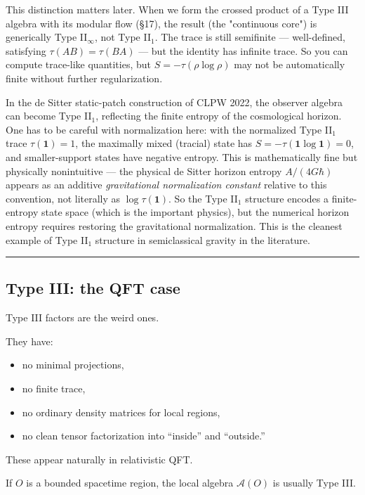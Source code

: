 \documentclass[11pt,a4paper]{article}
\begin{document}
This distinction matters later. When we form the crossed product of a Type III algebra with its modular flow (§17), the result (the "continuous core") is generically Type II$_\infty$, not Type II$_1$. The trace is still semifinite — well-defined, satisfying $\tau(AB) = \tau(BA)$ — but the identity has infinite trace. So you can compute trace-like quantities, but $S = -\tau(\rho \log \rho)$ may not be automatically finite without further regularization.

In the de Sitter static-patch construction of CLPW 2022, the observer algebra can become Type II$_1$, reflecting the finite entropy of the cosmological horizon. One has to be careful with normalization here: with the normalized Type II$_1$ trace $\tau(\mathbf{1}) = 1$, the maximally mixed (tracial) state has $S = -\tau(\mathbf{1} \log \mathbf{1}) = 0$, and smaller-support states have negative entropy. This is mathematically fine but physically nonintuitive — the physical de Sitter horizon entropy $A/(4G\hbar)$ appears as an additive \emph{gravitational normalization constant} relative to this convention, not literally as $\log \tau(\mathbf{1})$. So the Type II$_1$ structure encodes a finite-entropy state space (which is the important physics), but the numerical horizon entropy requires restoring the gravitational normalization. This is the cleanest example of Type II$_1$ structure in semiclassical gravity in the literature.

\medskip\hrule\medskip

\subsection{Type III: the QFT case}

Type III factors are the weird ones.

They have:

\begin{itemize}
  \item no minimal projections,
  \item no finite trace,
  \item no ordinary density matrices for local regions,
  \item no clean tensor factorization into “inside” and “outside.”
\end{itemize}

These appear naturally in relativistic QFT.

If $O$ is a bounded spacetime region, the local algebra $\mathcal{A}(O)$ is usually Type III.
\end{document}
